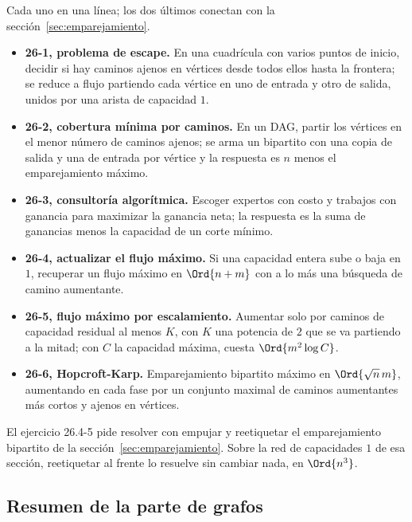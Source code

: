 \documentclass[11pt,letterpaper]{article}
\begin{document}
Cada uno en una línea; los dos últimos conectan con la
sección~\ref{sec:emparejamiento}.
\begin{itemize}
  \item \textbf{26-1, problema de escape.} En una cuadrícula con varios
        puntos de inicio, decidir si hay caminos ajenos en vértices
        desde todos ellos hasta la frontera; se reduce a flujo
        partiendo cada vértice en uno de entrada y otro de salida,
        unidos por una arista de capacidad $1$.
  \item \textbf{26-2, cobertura mínima por caminos.} En un DAG, partir
        los vértices en el menor número de caminos ajenos; se arma un
        bipartito con una copia de salida y una de entrada por vértice
        y la respuesta es $n$ menos el emparejamiento máximo.
  \item \textbf{26-3, consultoría algorítmica.} Escoger expertos con
        costo y trabajos con ganancia para maximizar la ganancia neta;
        la respuesta es la suma de ganancias menos la capacidad de un
        corte mínimo.
  \item \textbf{26-4, actualizar el flujo máximo.} Si una capacidad
        entera sube o baja en $1$, recuperar un flujo máximo en
        $\Ord{n + m}$ con a lo más una búsqueda de camino aumentante.
  \item \textbf{26-5, flujo máximo por escalamiento.} Aumentar solo por
        caminos de capacidad residual al menos $K$, con $K$ una
        potencia de $2$ que se va partiendo a la mitad; con $C$ la
        capacidad máxima, cuesta $\Ord{m^2 \log C}$.
  \item \textbf{26-6, Hopcroft-Karp.} Emparejamiento bipartito máximo
        en $\Ord{\sqrt{n}\, m}$, aumentando en cada fase por un
        conjunto maximal de caminos aumentantes más cortos y ajenos en
        vértices.
\end{itemize}

El ejercicio 26.4-5 pide resolver con empujar y reetiquetar el
emparejamiento bipartito de la sección~\ref{sec:emparejamiento}. Sobre
la red de capacidades $1$ de esa sección, reetiquetar al frente lo
resuelve sin cambiar nada, en $\Ord{n^3}$.


\subsection*{Resumen de la parte de grafos}
\end{document}
